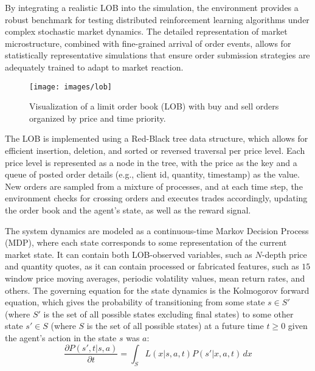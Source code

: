 \documentclass[11pt]{article}
\begin{document}
    By integrating a realistic LOB into the simulation, the environment provides a robust benchmark for testing
    distributed reinforcement learning algorithms under complex stochastic market dynamics.
    The detailed representation of market microstructure, combined with fine-grained arrival of order events,
    allows for statistically representative simulations that ensure order submission strategies
    are adequately trained to adapt to market reaction.

    \begin{figure}[htb]
        \centering
        \texttt{[image: images/lob]}
        \caption{Visualization of a limit order book (LOB) with buy and sell orders organized by price and time priority.}
        \label{fig:lob}
    \end{figure}

    The LOB is implemented using a Red-Black tree data structure, which allows for efficient insertion, deletion,
    and sorted or reversed traversal per price level.
    Each price level is represented as a node in the tree, with the price as the key and a queue of posted order details
    (e.g., client id, quantity, timestamp) as the value.
    New orders are sampled from a mixture of processes, and at each time step, the environment checks for crossing orders and executes trades accordingly,
    updating the order book and the agent's state, as well as the reward signal.

    The system dynamics are modeled as a continuous-time Markov Decision Process (MDP),
    where each state corresponds to some representation of the current market state.
    It can contain both LOB-observed variables, such as $N$-depth price and quantity quotes,
    as it can contain processed or fabricated features, such as $15$ window price moving averages,
    periodic volatility values, mean return rates, and others.
    The governing equation for the state dynamics is the Kolmogorov forward equation,
    which gives the probability of transitioning from some state $s \in S'$ (where $S'$ is the set of all possible states excluding final states)
    to some other state $s' \in S$ (where $S$ is the set of all possible states)
    at a future time $t \geq 0$ given the agent's action in the state $s$ was $a$:
    \begin{equation}
        \frac{\partial P(s', t|s, a)}{\partial t} = \int_S L(x|s, a, t) P(s'|x, a, t) \, dx
        \label{eq:kolmogorov}
    \end{equation}
\end{document}
